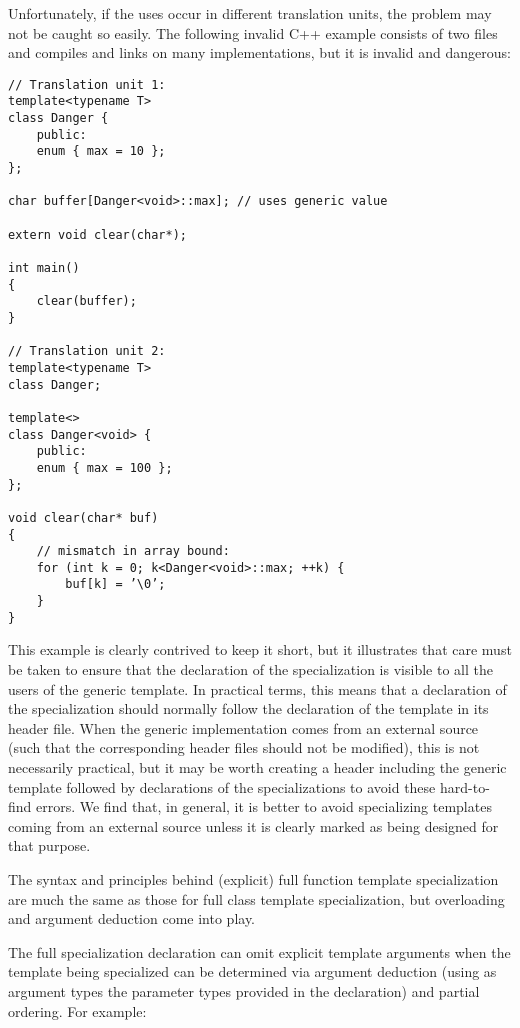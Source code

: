 Unfortunately, if the uses occur in different translation units, the problem may not be caught so easily. The following invalid C++ example consists of two files and compiles and links on many implementations, but it is invalid and dangerous:

\begin{lstlisting}[style=styleCXX]
// Translation unit 1:
template<typename T>
class Danger {
	public:
	enum { max = 10 };
};

char buffer[Danger<void>::max]; // uses generic value

extern void clear(char*);

int main()
{
	clear(buffer);
}

// Translation unit 2:
template<typename T>
class Danger;

template<>
class Danger<void> {
	public:
	enum { max = 100 };
};

void clear(char* buf)
{
	// mismatch in array bound:
	for (int k = 0; k<Danger<void>::max; ++k) {
		buf[k] = ’\0’;
	}
}
\end{lstlisting}

This example is clearly contrived to keep it short, but it illustrates that care must be taken to ensure that the declaration of the specialization is visible to all the users of the generic template. In practical terms, this means that a declaration of the specialization should normally follow the declaration of the template in its header file. When the generic implementation comes from an external source (such that the corresponding header files should not be modified), this is not necessarily practical, but it may be worth creating a header including the generic template followed by declarations of the specializations to avoid these hard-to-find errors. We find that, in general, it is better to avoid specializing templates coming from an external source unless it is clearly marked as being designed for that purpose.


The syntax and principles behind (explicit) full function template specialization are much the same as those for full class template specialization, but overloading and argument deduction come into play.

The full specialization declaration can omit explicit template arguments when the template being specialized can be determined via argument deduction (using as argument types the parameter types provided in the declaration) and partial ordering. For example:

